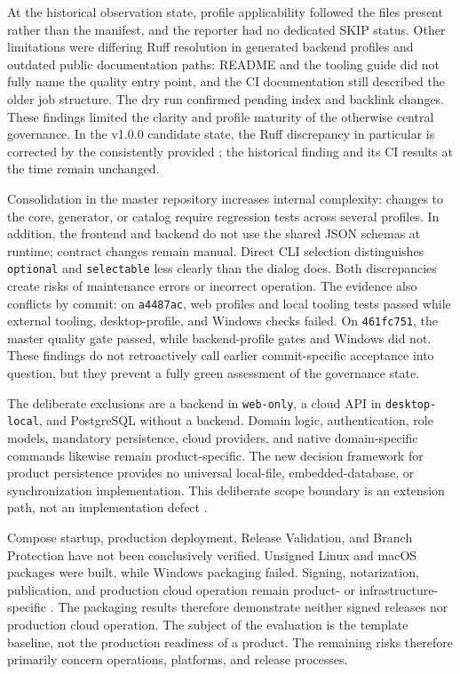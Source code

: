 At the historical observation state, profile applicability followed the files
present rather than the manifest, and the reporter had no dedicated SKIP
status. Other limitations were differing Ruff resolution in generated backend
profiles and outdated public documentation paths: README and the
tooling guide did not fully name the quality entry point, and the CI
documentation still described the older job structure. The dry run confirmed
pending index and backlink changes. These findings limited the clarity
and profile maturity of the otherwise central governance. In the v1.0.0
candidate state, the Ruff discrepancy in particular is corrected by the
consistently provided ; the historical finding and its CI
results at the time remain unchanged.

Consolidation in the master repository increases internal complexity: changes
to the core, generator, or catalog require regression tests across several
profiles. In addition, the frontend and backend do not use the shared JSON
schemas at runtime; contract changes remain manual. Direct CLI selection
distinguishes \texttt{optional} and \texttt{selectable} less clearly than the
dialog does. Both discrepancies create risks of maintenance errors or
incorrect operation.
The evidence also conflicts by commit: on \texttt{a4487ac}, web profiles and
local tooling tests passed while external tooling, desktop-profile, and Windows
checks failed. On \texttt{461fc751}, the master quality gate passed, while
backend-profile gates and Windows did not. These findings do not retroactively
call earlier commit-specific acceptance into question, but they prevent a fully
green assessment of the governance state.

The deliberate exclusions are a backend in \texttt{web-only}, a cloud API in
\texttt{desktop-local}, and PostgreSQL without a backend. Domain logic,
authentication, role models, mandatory persistence, cloud providers, and
native domain-specific commands likewise remain product-specific. The
new decision framework for product persistence provides no universal
local-file, embedded-database, or synchronization implementation. This
deliberate scope boundary is an extension path, not an implementation defect
\parencite{kleiveist2026persistence}.

Compose startup, production deployment, Release Validation, and Branch
Protection have not been conclusively verified. Unsigned Linux and macOS
packages were built, while Windows packaging failed. Signing, notarization,
publication, and production cloud operation remain product- or
infrastructure-specific
\parencite{kleiveist2026governance-core-run,kleiveist2026governance-desktop-run,kleiveist2026acceptance}.
The packaging results therefore demonstrate neither signed releases nor
production cloud operation. The subject of the evaluation is the template
baseline, not the production readiness of a product.
The remaining risks therefore primarily concern operations, platforms, and
release processes.
